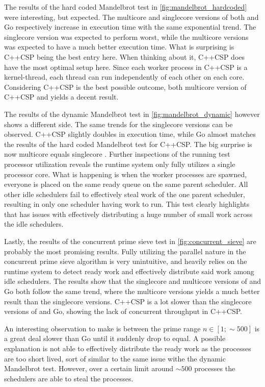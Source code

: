 The results of the hard coded Mandelbrot test in \cref{fig:mandelbrot_hardcoded} were interesting, but expected. The multicore and singlecore versions of both \Proxc{} and Go respectively increase in execution time with the same exponential trend. The singlecore version was expected to perform worst, while the multicore versions was expected to have a much better execution time. What is surprising is C++CSP being the best entry here. When thinking about it, C++CSP does have the most optimal setup here. Since each worker process in C++CSP is a kernel\hyp{}thread, each thread can run independently of each other on each core. Considering C++CSP is the best possible outcome, both multicore version of C++CSP and \Proxc{} yields a decent result.

The results of the dynamic Mandelbrot test in \cref{fig:mandelbrot_dynamic} however shows a different side. The same trends for the singlecore versions can be observed. C++CSP slightly doubles in execution time, while Go almost matches the results of the hard coded Mandelbrot test for C++CSP. The big surprise is now multicore \Proxc{} equals singlecore \Proxc{}. Further inspections of the running test processor utilization reveals the runtime system only fully utilizes a single processor core. What is happening is when the worker processes are spawned, everyone is placed on the same ready queue on the same parent scheduler. All other idle schedulers fail to effectively steal work of the one parent scheduler, resulting in only one scheduler having work to run. This test clearly highlights that \Proxc{} has issues with effectively distributing a huge number of small work across the idle schedulers.

Lastly, the results of the concurrent prime sieve test in \cref{fig:concurrent_sieve} are probably the most promising results. Fully utilizing the parallel nature in the concurrent prime sieve algorithm is very unintuitive, and heavily relies on the runtime system to detect ready work and effectively distribute said work among idle schedulers. The results show that the singlecore and multicore versions of \Proxc{} and Go both follow the same trend, where the multicore versions yields a much better result than the singlecore versions. C++CSP is a lot slower than the singlecore versions of \Proxc{} and Go, showing the lack of concurrent throughput in C++CSP. 

An interesting observation to make is between the prime range $n\in[1;\sim{}500]$ \Proxc{} is a great deal slower than Go until it suddenly drop to equal. A possible explanation is not able to effectively distribute the ready work as the processes are too short lived, sort of similar to the same issue withe the dynamic Mandelbrot test. However, over a certain limit around $\sim{}500$ processes the schedulers are able to steal the processes.

